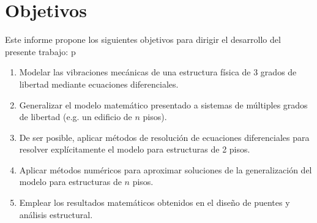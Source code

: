 \section{Objetivos}

Este informe propone los siguientes objetivos para dirigir el desarrollo del presente trabajo:
p
\begin{enumerate}
    \item Modelar las vibraciones mecánicas de una estructura física de 3 grados de libertad mediante ecuaciones diferenciales.
    \item Generalizar el modelo matemático presentado a sistemas de múltiples grados de libertad (e.g. un edificio de \(n\) pisos).
    \item De ser posible, aplicar métodos de resolución de ecuaciones diferenciales para resolver explícitamente el modelo para estructuras de 2 pisos.
    \item Aplicar métodos numéricos para aproximar soluciones de la generalización del modelo para estructuras de \(n\) pisos.
    \item Emplear los resultados matemáticos obtenidos en el diseño de puentes y análisis estructural.
\end{enumerate}
